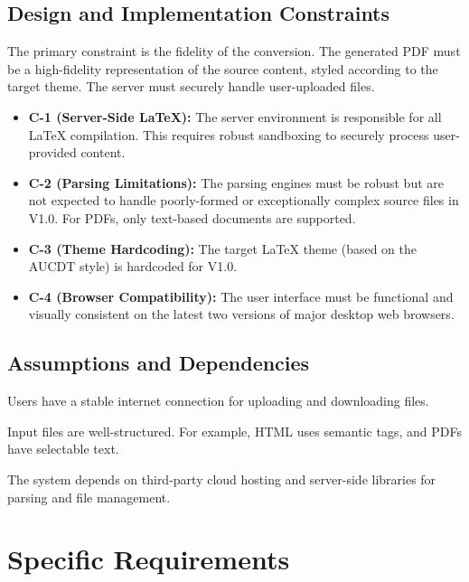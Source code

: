 \documentclass[a4paper, 11pt]{article}
\begin{document}
\subsection{Design and Implementation Constraints}
\begin{notebox}
    The primary constraint is the fidelity of the conversion. The generated PDF must be a high-fidelity representation of the source content, styled according to the target theme. The server must securely handle user-uploaded files.
\end{notebox}
\begin{itemize}[label={\color{AUCDTBurgundy}\faExclamationTriangle}]
    \item \textbf{C-1 (Server-Side LaTeX):} The server environment is responsible for all LaTeX compilation. This requires robust sandboxing to securely process user-provided content.
    \item \textbf{C-2 (Parsing Limitations):} The parsing engines must be robust but are not expected to handle poorly-formed or exceptionally complex source files in V1.0. For PDFs, only text-based documents are supported.
    \item \textbf{C-3 (Theme Hardcoding):} The target LaTeX theme (based on the AUCDT style) is hardcoded for V1.0.
    \item \textbf{C-4 (Browser Compatibility):} The user interface must be functional and visually consistent on the latest two versions of major desktop web browsers.
\end{itemize}

\subsection{Assumptions and Dependencies}
\begin{description}[style=unboxed]
    \item[\poppinssemibold Assumption:] Users have a stable internet connection for uploading and downloading files.
    \item[\poppinssemibold Assumption:] Input files are well-structured. For example, HTML uses semantic tags, and PDFs have selectable text.
    \item[\poppinssemibold Dependency:] The system depends on third-party cloud hosting and server-side libraries for parsing and file management.
\end{description}

\section{Specific Requirements}
\end{document}
